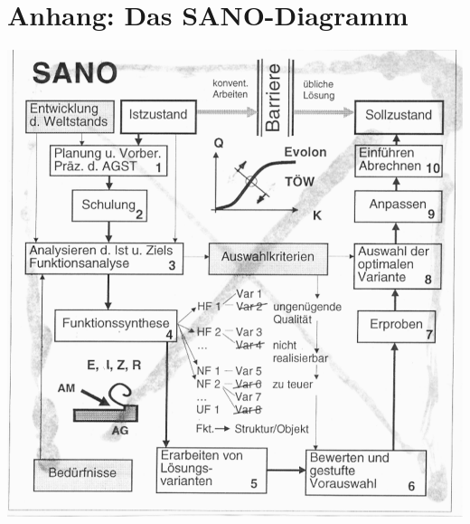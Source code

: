 \documentclass[11pt,a4paper]{article}
\begin{document}
\section*{Anhang: Das SANO-Diagramm}

\begin{center}  
  \includegraphics[width=.9\textwidth]{Herrlich-SANO.pdf}
\end{center}

\end{document}
